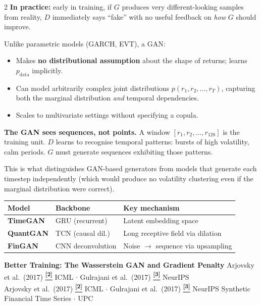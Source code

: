 \documentclass[10pt]{article}
\newcommand{\navybox}[2]{\begin{tcolorbox}[mybox={Navy}{LBg},title={#1}]#2\end{tcolorbox}}
\newcommand{\skybox}[2]{\begin{tcolorbox}[mybox={Sky}{BBg},title={#1}]#2\end{tcolorbox}}
\newcommand{\pagehead}[2]{%
  \begin{tcolorbox}[enhanced,arc=0pt,outer arc=0pt,boxrule=0pt,
    colback=Navy,colframe=Navy,
    top=5pt,bottom=5pt,left=8pt,right=8pt,
    before skip=0pt,after skip=10pt]
  {\color{white}\large\bfseries #1}%
  \ifx\relax#2\relax\else\\[1pt]{\color{blue!30!white}\small #2}\fi
  \hfill{\color{blue!20!white}\footnotesize Synthetic Financial Time Series $\cdot$ UPC}
  \end{tcolorbox}}
\newcommand{\tcite}[1]{%
  \hyperlink{R:#1}{\textsuperscript{\scriptsize\textbf{[#1]}}}}
\begin{document}
\begin{multicols}{2}
{\textbf{In practice:} early in training, if $G$ produces very different-looking samples from reality, $D$ immediately says ``fake'' with no useful feedback on \emph{how} $G$ should improve.}

\columnbreak

\skybox{What Makes GANs Suitable for Financial Returns?}{%
Unlike parametric models (GARCH, EVT), a GAN:
\begin{itemize}
  \item Makes \textbf{no distributional assumption} about the shape of returns; learns $p_\text{data}$ implicitly.
  \item Can model arbitrarily complex joint distributions $p(r_1, r_2, \ldots, r_T)$, capturing both the marginal distribution \emph{and} temporal dependencies.
  \item Scales to multivariate settings without specifying a copula.
\end{itemize}

\textbf{The GAN sees sequences, not points.}
A window $[r_1, r_2, \ldots, r_{128}]$ is the training unit. $D$ learns to recognise temporal patterns: bursts of high volatility, calm periods. $G$ must generate sequences exhibiting those patterns.

This is what distinguishes GAN-based generators from models that generate each timestep independently (which would produce no volatility clustering even if the marginal distribution were correct).}

\navybox{Three Architectural Choices in This Benchmark}{%
\begin{center}
\renewcommand{\arraystretch}{1.4}
\begin{tabular}{@{}lll@{}}
\toprule
\textbf{Model} & \textbf{Backbone} & \textbf{Key mechanism} \\
\midrule
\textcolor{TGcol}{\textbf{TimeGAN}}  & GRU (recurrent)  & Latent embedding space \\
\textcolor{QGcol}{\textbf{QuantGAN}} & TCN (causal dil.) & Long receptive field via dilation \\
\textcolor{FGcol}{\textbf{FinGAN}}   & CNN deconvolution & Noise $\to$ sequence via upsampling \\
\bottomrule
\end{tabular}
\end{center}}

\end{multicols}

\clearpage

\pagehead{Better Training: The Wasserstein GAN and Gradient Penalty}
         {Arjovsky et al.\ (2017)\tcite{2} ICML $\cdot$ Gulrajani et al.\ (2017)\tcite{3} NeurIPS}
\end{document}
